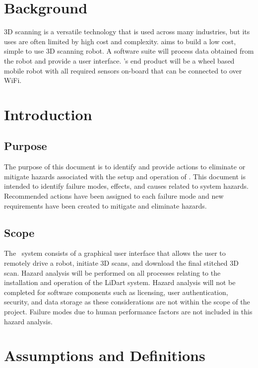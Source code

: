 \documentclass[12pt]{article}
\begin{document}

\section{Background}

3D scanning is a versatile technology that is used across many industries, but its uses are often limited by high cost
and complexity. \progname aims to build a low cost, simple to use 3D scanning robot. A software suite will process
data obtained from the robot and provide a user interface. \progname’s end product will be a wheel based mobile robot
with all required sensors on-board that can be connected to over WiFi.

\section{Introduction}

\subsection{Purpose}

The purpose of this document is to identify and provide actions to eliminate or mitigate hazards associated with the setup and operation of \progname. This document is intended to identify failure modes, effects, and causes related to system hazards. Recommended actions have been assigned to each failure mode and new requirements have been created to mitigate and eliminate hazards.

\subsection{Scope}
The \progname ~system consists of a graphical user interface that allows the user to remotely drive a robot, initiate 3D scans, and download the final stitched 3D scan. Hazard analysis will be performed on all processes relating to the installation and operation of the LiDart system.  Hazard analysis will not be completed for software components such as licensing, user authentication, security, and data storage as these considerations are not within the scope of the project. Failure modes due to human performance factors are not included in this hazard analysis.

\section{Assumptions and Definitions}
\end{document}
